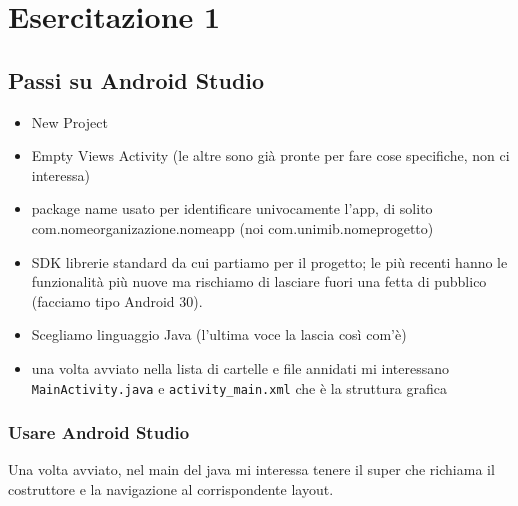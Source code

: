 
\chapter{Esercitazione 1}
\section{Passi su Android Studio}
\begin{itemize}
    \item New Project
    \item Empty Views Activity (le altre sono già pronte per fare cose specifiche, non ci interessa)
    \item package name usato per identificare univocamente l'app, di solito\\
    com.nomeorganizazione.nomeapp (noi com.unimib.nomeprogetto)
    \item SDK librerie standard da cui partiamo per il progetto; le più recenti hanno le funzionalità più nuove ma rischiamo di lasciare fuori una fetta di pubblico (facciamo tipo Android 30).
    \item Scegliamo linguaggio Java (l'ultima voce la lascia così com'è)
    \item una volta avviato nella lista di cartelle e file annidati mi interessano \texttt{MainActivity.java} e \texttt{activity\_main.xml} che è la struttura grafica
\end{itemize}

\subsection{Usare Android Studio}
\par Una volta avviato, nel main del java mi interessa tenere il super che richiama il costruttore e la navigazione al corrispondente layout.

